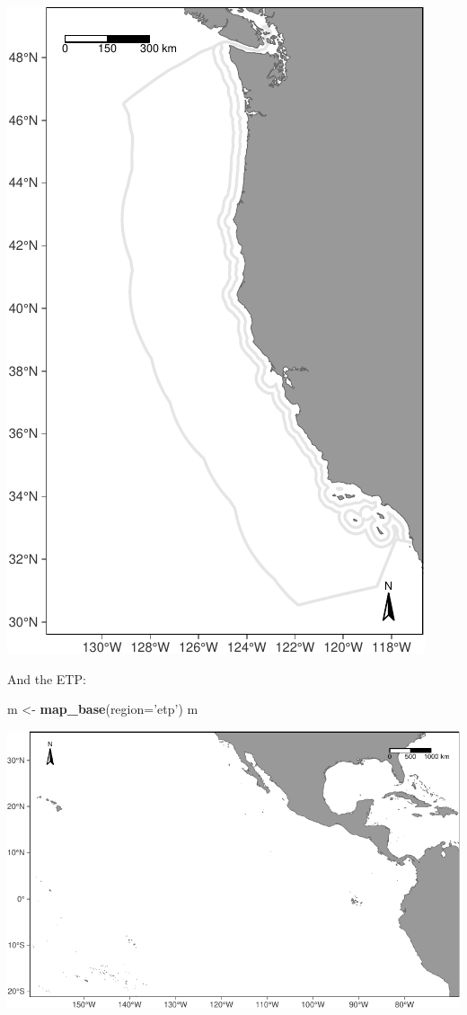 \documentclass[
]{book}
\newenvironment{Shaded}{\begin{snugshade}}{\end{snugshade}}
\newcommand{\DataTypeTok}[1]{\textcolor[rgb]{0.13,0.29,0.53}{#1}}
\newcommand{\KeywordTok}[1]{\textcolor[rgb]{0.13,0.29,0.53}{\textbf{#1}}}
\newcommand{\NormalTok}[1]{#1}
\newcommand{\StringTok}[1]{\textcolor[rgb]{0.31,0.60,0.02}{#1}}
\begin{document}
\includegraphics{figures/unnamed-chunk-55-1.pdf}

And the ETP:

\begin{Shaded}
\begin{Highlighting}[]
\NormalTok{m <-}\StringTok{ }\KeywordTok{map_base}\NormalTok{(}\DataTypeTok{region=}\StringTok{'etp'}\NormalTok{)}
\NormalTok{m}
\end{Highlighting}
\end{Shaded}

\includegraphics{figures/unnamed-chunk-56-1.pdf}
\end{document}
